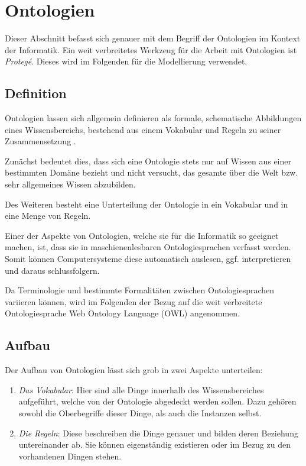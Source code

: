 \documentclass[12pt]{report}
\begin{document}
\subsubsection{}

\section{Ontologien}

Dieser Abschnitt befasst sich genauer mit dem Begriff der Ontologien im Kontext der Informatik. Ein weit verbreitetes Werkzeug für die Arbeit mit Ontologien ist \textit{Protegé}. Dieses wird im Folgenden für die Modellierung verwendet.

\subsection{Definition}
Ontologien lassen sich allgemein definieren als \glqq formale, schematische Abbildungen eines Wissensbereichs, bestehend aus einem Vokabular und Regeln zu seiner Zusammensetzung\grqq{} \cite{we13}.

Zunächst bedeutet dies, dass sich eine Ontologie stets nur auf Wissen aus einer bestimmten Domäne bezieht und nicht versucht, das gesamte über die Welt bzw. sehr allgemeines Wissen abzubilden. 

Des Weiteren besteht eine Unterteilung der Ontologie in ein Vokabular und in eine Menge von Regeln. 

Einer der Aspekte von Ontologien, welche sie für die Informatik so geeignet machen, ist, dass sie in maschienenlesbaren Ontologiesprachen verfasst werden. Somit können Computersysteme diese automatisch auslesen, ggf. interpretieren und daraus schlussfolgern. 

Da Terminologie und bestimmte Formalitäten zwischen Ontologiesprachen variieren können, wird im Folgenden der Bezug auf die weit verbreitete Ontologiesprache \glqq Web Ontology Language\grqq{} (OWL) angenommen.

\subsection{Aufbau}
Der Aufbau von Ontologien lässt sich grob in zwei Aspekte unterteilen: 

\begin{enumerate}
\item \textit{Das Vokabular}: Hier sind alle Dinge innerhalb des Wissensbereiches aufgeführt, welche von der Ontologie abgedeckt werden sollen. Dazu gehören sowohl die Oberbegriffe dieser Dinge, als auch die Instanzen selbst. 
\item \textit{Die Regeln}: Diese beschreiben die Dinge genauer und bilden deren Beziehung untereinander ab. Sie können eigenständig existieren oder im Bezug zu den vorhandenen Dingen stehen. 
\end{enumerate}
\end{document}
